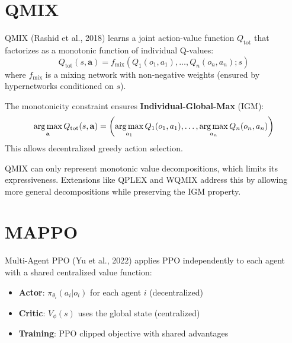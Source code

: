 \section{QMIX}
\label{sec:qmix}

\begin{definition}[QMIX]
QMIX (Rashid et al., 2018) learns a joint action-value function
$Q_{\text{tot}}$ that factorizes as a monotonic function of individual
Q-values:
\[
    Q_{\text{tot}}(s, \mathbf{a}) = f_{\text{mix}}\left(
    Q_1(o_1, a_1), \ldots, Q_n(o_n, a_n); s\right)
\]
where $f_{\text{mix}}$ is a mixing network with non-negative weights
(ensured by hypernetworks conditioned on $s$).
\end{definition}

\begin{proposition}
The monotonicity constraint ensures \textbf{Individual-Global-Max} (IGM):
\[
    \operatorname*{arg\,max}_{\mathbf{a}} Q_{\text{tot}}(s, \mathbf{a})
    = \left(\operatorname*{arg\,max}_{a_1} Q_1(o_1, a_1), \ldots,
    \operatorname*{arg\,max}_{a_n} Q_n(o_n, a_n)\right)
\]
This allows decentralized greedy action selection.
\end{proposition}

\begin{remark}
QMIX can only represent monotonic value decompositions, which limits
its expressiveness. Extensions like QPLEX and WQMIX address this by
allowing more general decompositions while preserving the IGM property.
\end{remark}

\section{MAPPO}
\label{sec:mappo}

\begin{definition}[MAPPO]
Multi-Agent PPO (Yu et al., 2022) applies PPO independently to each
agent with a shared centralized value function:
\begin{itemize}
    \item \textbf{Actor}: $\pi_{\theta_i}(a_i | o_i)$ for each agent $i$
    (decentralized)
    \item \textbf{Critic}: $V_\phi(s)$ uses the global state (centralized)
    \item \textbf{Training}: PPO clipped objective with shared advantages
\end{itemize}
\end{definition}

